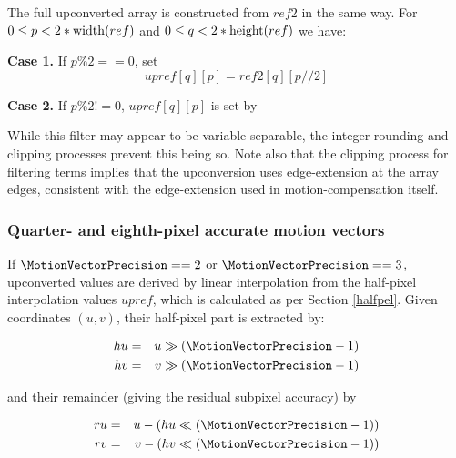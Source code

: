 The full upconverted array is constructed from $ref2$ in the same way.
 For $0\leq p<2*\operatorname{width}(ref)$ and $0\leq q<2*\operatorname{height}(ref)$ we have:

{\bf Case 1.} If $p\%2==0$, set
\begin{equation*}
upref[q][p]=ref2[q][p//2]
\end{equation*}

{\bf Case 2.} If $p\%2!=0$, $upref[q][p]$ is set by

\begin{pseudo*}
\end{pseudo*}

\begin{informative}
While this filter may appear to be variable separable, the integer rounding and 
clipping processes prevent this being so. Note also that the clipping process for
filtering terms implies that the upconversion uses edge-extension at the array
edges, consistent with the edge-extension used in motion-compensation itself.
\end{informative}

\subsubsection{Quarter- and eighth-pixel accurate motion vectors}

If $\MotionVectorPrecision==2$ or $\MotionVectorPrecision==3$, upconverted values are derived by linear
interpolation from the half-pixel interpolation values $upref$, which is calculated as 
per Section \ref{halfpel}. Given coordinates $(u,v)$, their half-pixel part
is extracted by:

\begin{eqnarray*}
hu & = & u \gg (\MotionVectorPrecision-1) \\
hv & = & v \gg (\MotionVectorPrecision-1) 
\end{eqnarray*}

and their remainder (giving the residual subpixel accuracy) by

\begin{eqnarray*}
ru & = & u-(hu\ll (\MotionVectorPrecision-1)) \\
rv & = & v-(hv\ll (\MotionVectorPrecision-1)) 
\end{eqnarray*}

